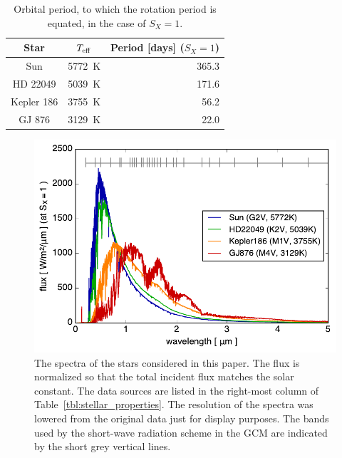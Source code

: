 \documentclass[11pt,numberedappendix,twocolappendix,]{emulateapj}
\begin{document}
\begin{table}[btp]
\caption{Orbital period, to which the rotation period is equated, in the case of $S_X=1$. }
\begin{center}
\begin{tabular}{ccr} \hline \hline
%
Star & $T_{\rm eff}$ & Period [days] ($S_X=1$) \\ \hline
%
Sun & 5772~K & 365.3 \\ 
%
HD 22049 & 5039~K & 171.6 \\
%
Kepler 186 & 3755~K & 56.2 \\
%
GJ 876 & 3129~K & 22.0 \\ \hline
\end{tabular}
\end{center}
\label{tbl:orbital_period}
\end{table}%


\begin{figure}[!b]
    \begin{center}
    \includegraphics[width=\hsize]{star_spectra.pdf}
    \end{center}
\caption{The spectra of the stars considered in this paper. The flux is normalized so that the total incident flux matches the solar constant. The data sources are listed in the right-most column of Table~\ref{tbl:stellar_properties}. The resolution of the spectra was lowered from the original data just for display purposes. The bands used by the short-wave radiation scheme in the GCM are indicated by the short grey vertical lines.}
\label{fig:star_spectra}
\end{figure}
\end{document}

